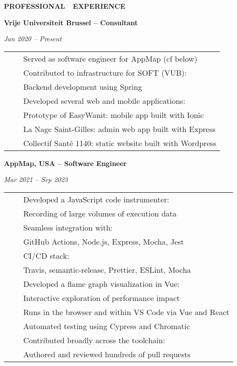 \documentclass[a4paper,11pt,english]{article}
\newcommand{\MarginColumn}[0]{28pt}
\newcommand{\RightColumn}[0]{10.5cm}
\newcommand{\ItemSkip}[0]{4pt}
\newcommand{\SubItemSkip}[0]{0pt}
\newcommand{\SubSubItemSkip}[0]{0pt}
\newcommand{\Bullet}[0]{\faCaretRight~~}
\newcommand{\BeginSubRubricSkip}[0]{6pt}
\newcommand{\EndSubRubric}[0]{\vspace{4pt}}
\newcommand{\Rubric}[1]{\colorbox{gray!20}{\parbox{\linewidth}{\centering\sffamily\bfseries{}#1}}}
\newcommand{\SubRubric}[1]{\parbox{\linewidth}{\sffamily\bfseries{}#1}}
\begin{document}
\hspace{\MarginColumn}
\begin{minipage}[t]{\RightColumn}
\vspace{-18pt}\Rubric{\faBriefcase \quad PROFESSIONAL~~EXPERIENCE}\vspace{16pt}

\SubRubric{Vrije Universiteit Brussel -- Consultant}

\emph{Jan 2020 -- Present} \\[\BeginSubRubricSkip]
\begin{tabularx}{\linewidth}{@{}l@{}l@{}}
\Bullet & Served as software engineer for AppMap (cf below) \\[\ItemSkip]
\Bullet & Contributed to infrastructure for SOFT (VUB): \\[\SubItemSkip]
& \quad Backend development using Spring \\[\ItemSkip]
\Bullet & Developed several web and mobile applications: \\[\SubItemSkip]
& \quad Prototype of EasyWanit: mobile app built with Ionic \\[\SubItemSkip]
& \quad La Nage Saint-Gilles: admin web app built with Express \\[0pt]
& \quad Collectif Santé 1140: static website built with Wordpress \\[\SubItemSkip]
\end{tabularx}
\EndSubRubric{}

\SubRubric{AppMap, USA -- Software Engineer}
\emph{Mar 2021 -- Sep 2023} \\[\BeginSubRubricSkip]
\begin{tabularx}{\linewidth}{@{}l@{}l@{}}
\Bullet & Developed a JavaScript code instrumenter: \\[\SubItemSkip]
& \quad Recording of large volumes of execution data \\[\SubItemSkip]
& \quad Seamless integration with: \\[\SubSubItemSkip]
& \quad \quad GitHub Actions, Node.js, Express, Mocha, Jest \\[\SubItemSkip]
& \quad CI/CD stack: \\[\SubSubItemSkip]
& \quad \quad Travis, semantic-release, Prettier, ESLint, Mocha \\[\ItemSkip]
\Bullet & Developed a flame graph visualization in Vue: \\[\SubItemSkip]
& \quad Interactive exploration of performance impact \\[\SubItemSkip]
& \quad Runs in the browser and within VS Code via Vue and React \\[\SubItemSkip]
& \quad Automated testing using Cypress and Chromatic \\[\ItemSkip]
\Bullet & Contributed broadly across the toolchain: \\[\SubItemSkip]
& \quad Authored and reviewed hundreds of pull requests \\[\ItemSkip]
\end{tabularx}
\EndSubRubric{}


\end{minipage}
\end{document}
